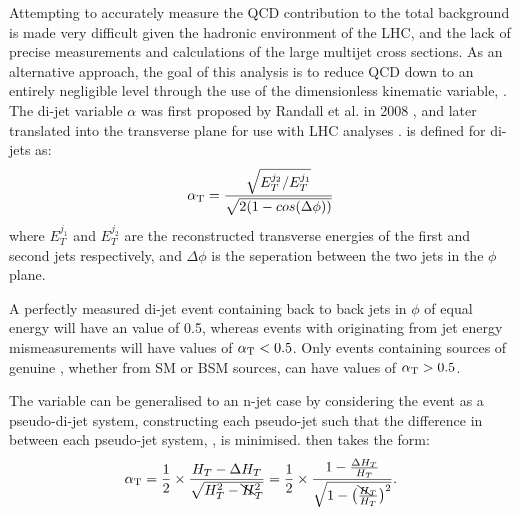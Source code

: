Attempting to accurately measure the QCD contribution to the total background is
made very difficult given the hadronic environment of the LHC, and the lack of 
precise measurements and calculations of the large multijet cross sections. As an 
alternative approach, the goal of this analysis is to reduce QCD down to an
entirely negligible level through the use of the dimensionless kinematic
variable, \alphat. The di-jet variable
$\alpha$ was first proposed by Randall et al. in 2008 \cite{Randall:2008rw},
and later translated into the transverse plane for use with LHC analyses
\cite{CMS:2008vya, CMS-PAS-SUS-09-001}.
\alphat is defined for di-jets as:
% 
\begin{equation}
\alpha_{\text{T}} = \frac{ \sqrt{E_T^{j_2}/E_T^{j_1}} }{ \sqrt{2(1-cos(\Delta \phi))} }
\label{eq:alphat_di-jet}
\end{equation}
% 
where $E_T^{j_1}$ and $E_T^{j_2}$ are the reconstructed transverse energies of 
the first and second jets respectively, and $\Delta \phi$ is the seperation 
between the two jets in the $\phi$ plane.

A perfectly measured di-jet event containing back to back jets in $\phi$ of equal energy will
have an \alphat value of 0.5, whereas 
events with \met originating from jet energy mismeasurements will have values of $\alpha_{\text{T}}<0.5$.
Only events containing sources of genuine \met, whether from SM or BSM sources,
can have values of $\alpha_{\text{T}} > 0.5$.
% 
% 
% 
% 

The \alphat variable can be generalised to an n-jet case by considering the event as a 
pseudo-di-jet system, constructing each pseudo-jet such that the difference in \HT
between each pseudo-jet system, \deltaHT, is minimised. \alphat then takes the 
form:
% 
\begin{equation}
\alpha_{\text{T}} = \frac{1}{2} \times \frac{H_T-\Delta H_T}{\sqrt{H_T^2 - \bcancel{H}_T^2}} = 
\frac{1}{2} \times \frac{1-\frac{\Delta H_T}{H_T}}{\sqrt{1 - \big(\frac{\bcancel{H}_T}
{H_T}\big)^2}}.
\label{eq:alphat_njet}
\end{equation}
% 

